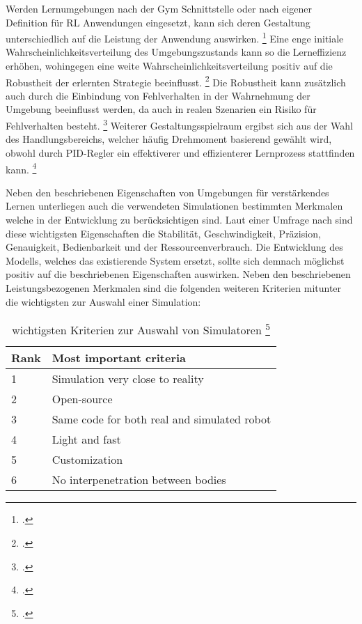 Werden Lernumgebungen nach der Gym Schnittstelle oder nach eigener Definition für RL Anwendungen eingesetzt, kann sich deren Gestaltung unterschiedlich auf die Leistung der Anwendung auswirken. \footcite[Vgl.][S. 1]{Reda.2020}
Eine enge initiale Wahrscheinlichkeitsverteilung des Umgebungszustands kann so die Lerneffizienz erhöhen, wohingegen eine weite Wahrscheinlichkeitsverteilung positiv auf die Robustheit der erlernten Strategie beeinflusst. \footcite[Vgl.][S. 3]{Reda.2020}
Die Robustheit kann zusätzlich auch durch die Einbindung von Fehlverhalten in der Wahrnehmung der Umgebung beeinflusst werden, da auch in realen Szenarien ein Risiko für Fehlverhalten besteht. \footcite[Vgl.][S. 2]{YanDuan.2016} 
Weiterer Gestaltungsspielraum ergibst sich aus der Wahl des Handlungsbereichs, welcher häufig Drehmoment basierend gewählt wird, obwohl durch PID-Regler ein effektiverer und effizienterer Lernprozess stattfinden kann. \footcite[Vgl.][S. 7]{Reda.2020}

Neben den beschriebenen Eigenschaften von Umgebungen für verstärkendes Lernen unterliegen auch die verwendeten Simulationen bestimmten Merkmalen welche in der Entwicklung zu berücksichtigen sind.
Laut einer Umfrage nach \cite[]{Ivaldi.2272014} sind diese wichtigsten Eigenschaften die Stabilität, Geschwindigkeit, Präzision, Genauigkeit, Bedienbarkeit und der Ressourcenverbrauch.
Die Entwicklung des Modells, welches das existierende System ersetzt, sollte sich demnach möglichst positiv auf die beschriebenen Eigenschaften auswirken.
Neben den beschriebenen Leistungsbezogenen Merkmalen sind die folgenden weiteren Kriterien mitunter die wichtigsten zur Auswahl einer Simulation:

\begin{table}[H]
    \centering
    \begin{tabular}{|l|l|}
    \hline
    Rank & Most important criteria                     \\ \hline
    1    & Simulation very close to reality            \\
    2    & Open-source                                 \\
    3    & Same code for both real and simulated robot \\
    4    & Light and fast                              \\
    5    & Customization                               \\
    6    & No interpenetration between bodies          \\ \hline
    \end{tabular}
    \caption{wichtigsten Kriterien zur Auswahl von Simulatoren \footcite[][S. 4]{Ivaldi.2272014}}
    \label{tab:important-criteria}
\end{table}

